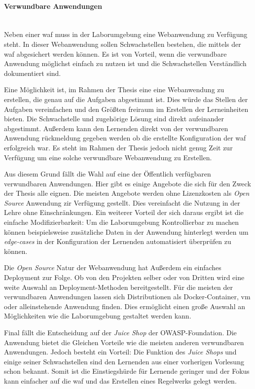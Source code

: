 \paragraph{Verwundbare Anwendungen}\ \\

Neben einer \ac{waf} muss in der Laborumgebung eine Webanwendung zu Verfügung steht.
In dieser Webanwendung sollen Schwachstellen bestehen, die mittels der \ac{waf} abgesichert werden können.
Es ist von Vorteil, wenn die verwundbare Anwendung möglichst einfach zu nutzen ist und die Schwachstellen Verständlich dokumentiert sind.

Eine Möglichkeit ist, im Rahmen der Thesis eine eine Webanwendung zu erstellen, die genau auf die Aufgaben abgestimmt ist.
Dies würde das Stellen der Aufgaben vereinfachen und den Größten freiraum im Erstellen der Lerneinheiten bieten.
Die Schwachstelle und zugehörige Lösung sind direkt aufeinander abgestimmt.
Außerdem kann den Lernenden direkt von der verwundbaren Anwendung rückmeldung gegeben werden ob die erstellte Konfiguration der \ac{waf} erfolgreich war.
Es steht im Rahmen der Thesis jedoch nicht genug Zeit zur Verfügung um eine solche verwundbare Webanwendung zu Erstellen.

Aus diesem Grund fällt die Wahl auf eine der Öffentlich verfügbaren verwundbaren Anwendungen.
Hier gibt es einige Angebote die sich für den Zweck der Thesis alle eignen.
Die meisten Angebote werden ohne Lizenzkosten als \textit{Open Source} Anwendung zir Verfügung gestellt.
Dies vereinfacht die Nutzung in der Lehre ohne Einschränkungen.
Ein weiterer Vorteil der sich daraus ergibt ist die einfache Modifizierbarkeit:
Um die Laborumgebung Kontrollierbar zu machen können beispielsweise zusätzliche Daten in der Anwendung hinterlegt werden um \textit{edge-cases} in der Konfiguration der Lernenden automatisiert überprüfen zu können.

Die \textit{Open Source} Natur der Webanwendung hat Außerdem ein einfaches Deployment zur Folge.
Ob von den Projekten selber oder von Dritten wird eine weite Auswahl an Deployment-Methoden bereitgestellt.
Für die meisten der verwundbaren Anwendungen lassen sich Distributionen als Docker-Container, \ac{vm} oder alleinstehende Anwendung finden.
Dies ermöglicht einen große Auswahl an Möglichkeiten wie die Laborumgebung gestaltet werden kann.

Final fällt die Entscheidung auf der \textit{Juice Shop} der OWASP-Foundation.
Die Anwendung bietet die Gleichen Vorteile wie die meisten anderen verwundbaren Anwendungen.
Jedoch besteht ein Vorteil:
Die Funktion des \textit{Juice Shops} und einige seiner Schwachstellen sind den Lernenden aus einer vorherigen Vorlesung schon bekannt.
Somit ist die Einstiegshürde für Lernende geringer und der Fokus kann einfacher auf die \ac{waf} und das Erstellen eines Regelwerks gelegt werden.

